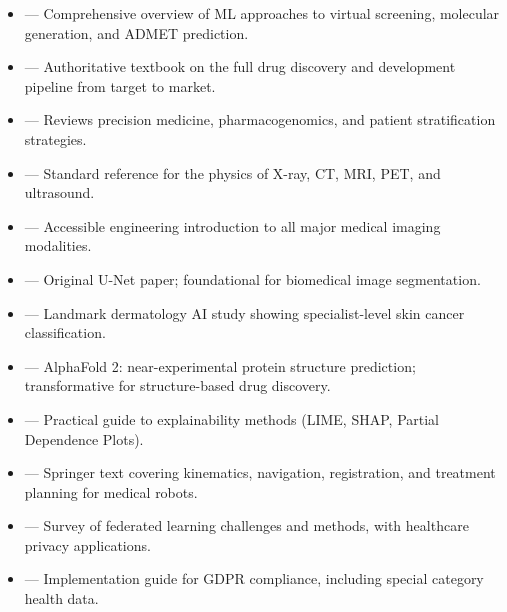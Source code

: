 \begin{tcbitemize}[ skin=sectionraster ]
    \tcbitem[title=Recommended Sources for AI in Healthcare and Medical Imaging, raster multicolumn=6]
    \begin{itemize}
        \item {} --- Comprehensive overview of ML approaches to virtual screening, molecular generation, and ADMET prediction.
        \item {} --- Authoritative textbook on the full drug discovery and development pipeline from target to market.
        \item {} --- Reviews precision medicine, pharmacogenomics, and patient stratification strategies.
        \item {} --- Standard reference for the physics of X-ray, CT, MRI, PET, and ultrasound.
        \item {} --- Accessible engineering introduction to all major medical imaging modalities.
        \item {} --- Original U-Net paper; foundational for biomedical image segmentation.
        \item {} --- Landmark dermatology AI study showing specialist-level skin cancer classification.
        \item {} --- AlphaFold 2: near-experimental protein structure prediction; transformative for structure-based drug discovery.
        \item {} --- Practical guide to explainability methods (LIME, SHAP, Partial Dependence Plots).
        \item {} --- Springer text covering kinematics, navigation, registration, and treatment planning for medical robots.
        \item {} --- Survey of federated learning challenges and methods, with healthcare privacy applications.
        \item {} --- Implementation guide for GDPR compliance, including special category health data.
    \end{itemize}
    \end{tcbitemize}
